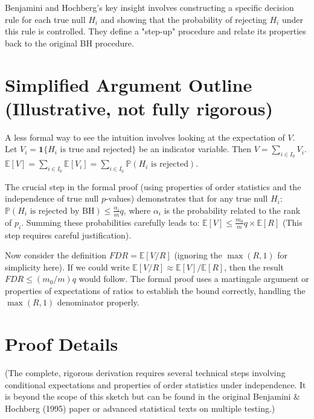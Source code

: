 \documentclass[12pt]{book}
\newcommand{\E}{\mathbb{E}}              %
\newcommand{\Prob}{\mathbb{P}}           %
\newcommand{\FDR}{{FDR}}    %
\newcommand{\pvalue}{$p$-value}          %
\begin{document}
Benjamini and Hochberg's key insight involves constructing a specific decision rule for each true null $H_i$ and showing that the probability of rejecting $H_i$ under this rule is controlled. They define a "step-up" procedure and relate its properties back to the original BH procedure.

\section{Simplified Argument Outline (Illustrative, not fully rigorous)}
A less formal way to see the intuition involves looking at the expectation of $V$.
Let $V_i = \mathbf{1}\{H_i \text{ is true and rejected}\}$ be an indicator variable. Then $V = \sum_{i \in I_0} V_i$.
$\E[V] = \sum_{i \in I_0} \E[V_i] = \sum_{i \in I_0} \Prob(H_i \text{ is rejected})$.

The crucial step in the formal proof (using properties of order statistics and the independence of true null \pvalue s) demonstrates that for any true null $H_i$:
$\Prob(H_i \text{ is rejected by BH}) \le \frac{\alpha_i}{m} q$, where $\alpha_i$ is the probability related to the rank of $p_i$. Summing these probabilities carefully leads to:
$\E[V] \le \frac{m_0}{m} q \times \E[R]$ (This step requires careful justification).

Now consider the definition $\FDR = \E[V/R]$ (ignoring the $\max(R,1)$ for simplicity here). If we could write $\E[V/R] \approx \E[V] / \E[R]$, then the result $\FDR \le (m_0/m)q$ would follow. The formal proof uses a martingale argument or properties of expectations of ratios to establish the bound correctly, handling the $\max(R,1)$ denominator properly.

\section{Proof Details}
(The complete, rigorous derivation requires several technical steps involving conditional expectations and properties of order statistics under independence. It is beyond the scope of this sketch but can be found in the original Benjamini & Hochberg (1995) paper or advanced statistical texts on multiple testing.)

\end{document}
